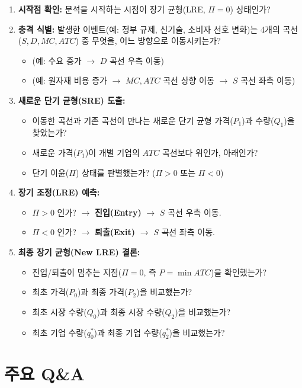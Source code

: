 \documentclass[11pt,a4paper]{article}
\theoremstyle{definition}
\begin{document}
\begin{enumerate}
    \item [ ] \textbf{시작점 확인:} 분석을 시작하는 시점이 장기 균형(LRE, $\Pi=0$) 상태인가?
    \item [ ] \textbf{충격 식별:} 발생한 이벤트(예: 정부 규제, 신기술, 소비자 선호 변화)는 4개의 곡선 ($S, D, MC, ATC$) 중 무엇을, 어느 방향으로 이동시키는가?
    \begin{itemize}
        \item (예: 수요 증가 $\to$ $D$ 곡선 우측 이동)
        \item (예: 원자재 비용 증가 $\to$ $MC, ATC$ 곡선 상향 이동 $\to$ $S$ 곡선 좌측 이동)
    \end{itemize}
    \item [ ] \textbf{새로운 단기 균형(SRE) 도출:}
    \begin{itemize}
        \item [ ] 이동한 곡선과 기존 곡선이 만나는 새로운 단기 균형 가격($P_1$)과 수량($Q_1$)을 찾았는가?
        \item [ ] 새로운 가격($P_1$)이 개별 기업의 $ATC$ 곡선보다 위인가, 아래인가?
        \item [ ] 단기 이윤($\Pi$) 상태를 판별했는가? ($\Pi > 0$ 또는 $\Pi < 0$)
    \end{itemize}
    \item [ ] \textbf{장기 조정(LRE) 예측:}
    \begin{itemize}
        \item [ ] $\Pi > 0$ 인가? $\to$ \textbf{진입(Entry)} $\to$ $S$ 곡선 우측 이동.
        \item [ ] $\Pi < 0$ 인가? $\to$ \textbf{퇴출(Exit)} $\to$ $S$ 곡선 좌측 이동.
    \end{itemize}
    \item [ ] \textbf{최종 장기 균형(New LRE) 결론:}
    \begin{itemize}
        \item [ ] 진입/퇴출이 멈추는 지점($\Pi=0$, 즉 $P = \min ATC$)을 확인했는가?
        \item [ ] 최초 가격($P_0$)과 최종 가격($P_2$)을 비교했는가?
        \item [ ] 최초 시장 수량($Q_0$)과 최종 시장 수량($Q_2$)을 비교했는가?
        \item [ ] 최초 기업 수량($q_0^*$)과 최종 기업 수량($q_2^*$)을 비교했는가?
    \end{itemize}
\end{enumerate}

\section{주요 Q\&A}
\end{document}
